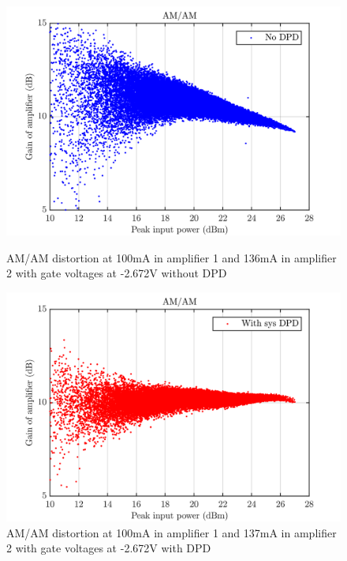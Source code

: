 \begin{figure}[H]
  \centering
  \begin{minipage}[b]{0.5\textwidth}
	\includegraphics[scale = 0.5]{figures/measurement/cree/meas5/amam_no_dpd_2p672v.png}
	\caption{AM/AM distortion at 100mA in amplifier 1 and 136mA in amplifier 2 with gate voltages at -2.672V without DPD}	
    \label{fig:meas5_7}
  \end{minipage}
  \hfill
  \begin{minipage}[b]{0.4\textwidth}
	\includegraphics[scale = 0.5]{figures/measurement/cree/meas5/amam_sys_dpd_2p672v.png}
	\caption{AM/AM distortion at 100mA in amplifier 1 and 137mA in amplifier 2 with gate voltages at -2.672V with DPD}
    \label{fig:meas5_8}
  \end{minipage}
\end{figure}


